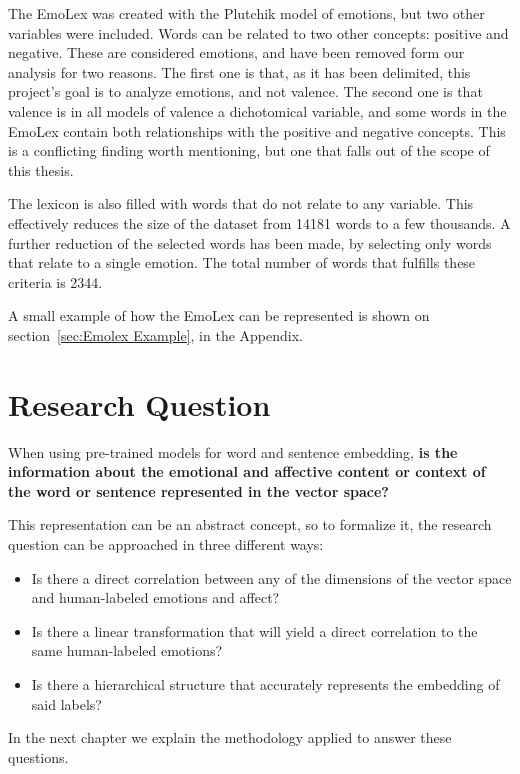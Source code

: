 The EmoLex was created with the Plutchik model of emotions, but two other variables were included. Words can be related to two other concepts: positive and negative. These are considered emotions, and have been removed form our analysis for two reasons. The first one is that, as it has been delimited, this project's goal is to analyze emotions, and not valence. The second one is that valence is in all models of valence a dichotomical variable, and some words in the EmoLex contain both relationships with the positive and negative concepts. This is a conflicting finding worth mentioning, but one that falls out of the scope of this thesis.

The lexicon is also filled with words that do not relate to any variable. This effectively reduces the size of the dataset from 14181 words to a few thousands. A further reduction of the selected words has been made, by selecting only words that relate to a single emotion. The total number of words that fulfills these criteria is 2344.

A small example of how the EmoLex can be represented is shown on section~\ref{sec:Emolex Example}, in the Appendix.

\section{Research Question}\label{sec:Research Question}
When using pre-trained models for word and sentence embedding, \textbf{is the information about the emotional and affective content or context of the word or sentence represented in the vector space?}

This representation can be an abstract concept, so to formalize it, the research question can be approached in three different ways:

\begin{itemize}
  \item Is there a direct correlation between any of the dimensions of the vector space and human-labeled emotions and affect?
  \item Is there a linear transformation that will yield a direct correlation to the same human-labeled emotions?
  \item Is there a hierarchical structure that accurately represents the embedding of said labels?
\end{itemize}

In the next chapter we explain the methodology applied to answer these questions.
